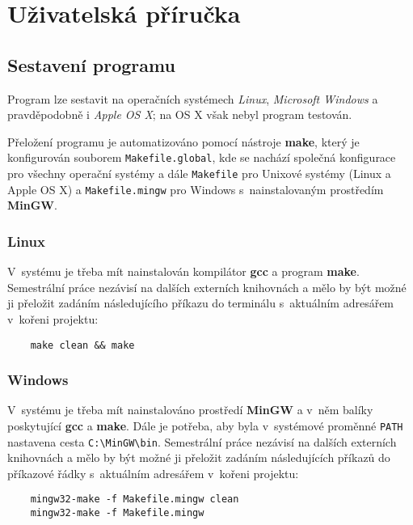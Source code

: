 \section{Uživatelská příručka}

\subsection{Sestavení programu}

Program lze sestavit na operačních systémech \textit{Linux}, \textit{Microsoft Windows} a pravděpodobně
i \textit{Apple OS X}; na OS X však nebyl program testován.

Přeložení programu je automatizováno pomocí nástroje \textbf{make}, který je konfigurován souborem
\verb|Makefile.global|, kde se nachází společná konfigurace pro všechny operační systémy a dále \verb|Makefile| pro
Unixové systémy (Linux a Apple OS X) a \verb|Makefile.mingw| pro Windows s~nainstalovaným prostředím \textbf{MinGW}.

\subsubsection{Linux}

V~systému je třeba mít nainstalován kompilátor \textbf{gcc} a program \textbf{make}. Semestrální práce nezávisí
na dalších externích knihovnách a mělo by být možné ji přeložit zadáním následujícího příkazu do terminálu s~aktuálním
adresářem v~kořeni projektu:

\begin{verbatim}
    make clean && make
\end{verbatim}


\subsubsection{Windows}

V~systému je třeba mít nainstalováno prostředí \textbf{MinGW} a v~něm balíky poskytující \textbf{gcc} a \textbf{make}.
Dále je potřeba, aby byla v~systémové proměnné \verb|PATH| nastavena cesta \verb|C:\MinGW\bin|.
Semestrální práce nezávisí na dalších externích knihovnách a mělo by být možné ji přeložit zadáním následujících
příkazů do příkazové řádky s~aktuálním adresářem v~kořeni projektu:

\begin{verbatim}
    mingw32-make -f Makefile.mingw clean
    mingw32-make -f Makefile.mingw
\end{verbatim}


